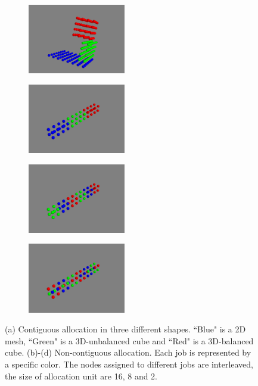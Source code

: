 \begin{figure}[t!]
    \centering
    \begin{subfigure}[t]{0.22\textwidth}
        \centering
        \includegraphics[height=1.2in]{figs/allocshape/allocation}
        \caption{ }
        \label{fig:cont_sub1}
    \end{subfigure}%
    \hspace{1em}%
    \begin{subfigure}[t]{0.22\textwidth}
        \centering
        \includegraphics[height=1.2in]{figs/allocshape/unitsize/unit16}
        \caption{ }
        \label{fig:noncont_sub1}
    \end{subfigure}%
    \hspace{1em}%
    \begin{subfigure}[t]{0.22\textwidth}
        \centering
        \includegraphics[height=1.2in]{figs/allocshape/unitsize/unit8}
        \caption{ }
        \label{fig:noncont_sub2}
    \end{subfigure}%
    \hspace{1em}%
    \begin{subfigure}[t]{0.22\textwidth}
        \centering
        \includegraphics[height=1.2in]{figs/allocshape/unitsize/unit2}
        \caption{ }
        \label{fig:noncont_sub3}
    \end{subfigure}%
    \caption{
    (a) Contiguous allocation in three different shapes. 
    ``Blue" is a 2D mesh, ``Green" is a 3D-unbalanced cube and ``Red" is a 3D-balanced cube. 
    (b)-(d) Non-contiguous allocation. Each job is represented by a specific color. 
    The nodes assigned to different jobs are interleaved, 
    the size of allocation unit are 16, 8 and 2.
    }
    \label{fig:alloc-shapes}
\end{figure}


